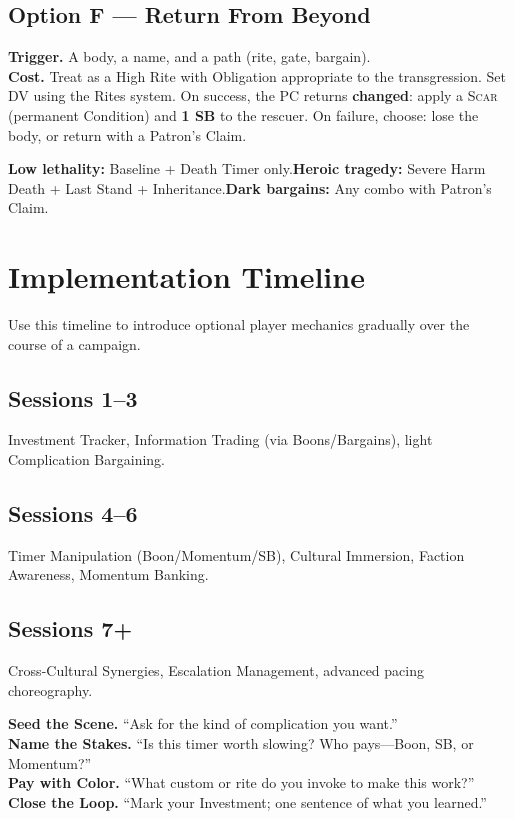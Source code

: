 \subsection*{Option F --- Return From Beyond}
\textbf{Trigger.} A body, a name, and a path (rite, gate, bargain).\\
\textbf{Cost.} Treat as a High Rite with Obligation appropriate to the transgression. Set DV using the Rites system. On success, the PC returns \textbf{changed}: apply a \textsc{Scar} (permanent Condition) and \textbf{1 SB} to the rescuer. On failure, choose: lose the body, or return with a Patron's Claim.

\begin{tcolorbox}[colback=gray!5!white,colframe=black,title=Quick Picks,breakable]
\small \textbf{Low lethality:} Baseline + Death Timer only.\quad \textbf{Heroic tragedy:} Severe Harm Death + Last Stand + Inheritance.\quad \textbf{Dark bargains:} Any combo with Patron's Claim.
\end{tcolorbox}

\section{Implementation Timeline}

Use this timeline to introduce optional player mechanics gradually over the course of a campaign.

\subsection*{Sessions 1--3}
Investment Tracker, Information Trading (via Boons/Bargains), light Complication Bargaining.

\subsection*{Sessions 4--6}
Timer Manipulation (Boon/Momentum/SB), Cultural Immersion, Faction Awareness, Momentum Banking.

\subsection*{Sessions 7+}
Cross-Cultural Synergies, Escalation Management, advanced pacing choreography.

\begin{tcolorbox}[colback=blue!5!white,colframe=blue!75!black,title=At-Table Prompts,fonttitle=\bfseries,breakable]
\textbf{Seed the Scene.} ``Ask for the kind of complication you want.''\\
\textbf{Name the Stakes.} ``Is this timer worth slowing? Who pays---Boon, SB, or Momentum?''\\
\textbf{Pay with Color.} ``What custom or rite do you invoke to make this work?''\\
\textbf{Close the Loop.} ``Mark your Investment; one sentence of what you learned.''
\end{tcolorbox}

